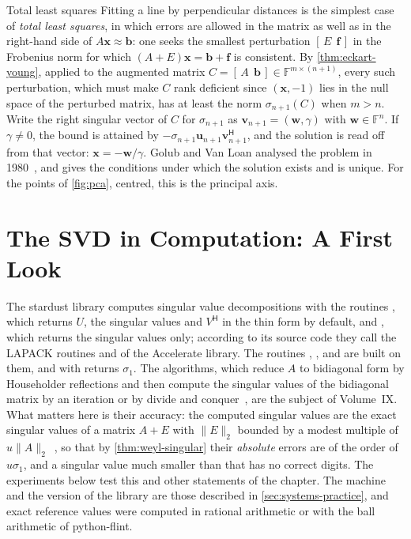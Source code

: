 \begin{note}{Total least squares}
Fitting a line by perpendicular distances is the simplest case of \emph{total least squares}, in which errors are allowed in the matrix as well as in the right-hand side of $A\mathbf x\approx\mathbf b$: one seeks the smallest perturbation $[\,E\ \ \mathbf f\,]$ in the Frobenius norm for which $(A+E)\mathbf x=\mathbf b+\mathbf f$ is consistent. By \cref{thm:eckart-young}, applied to the augmented matrix $C=[\,A\ \ \mathbf b\,]\in\mathbb F^{m\times(n+1)}$, every such perturbation, which must make $C$ rank deficient since $(\mathbf x,-1)$ lies in the null space of the perturbed matrix, has at least the norm $\sigma_{n+1}(C)$ when $m>n$. Write the right singular vector of $C$ for $\sigma_{n+1}$ as $\mathbf v_{n+1}=(\mathbf w,\gamma)$ with $\mathbf w\in\mathbb F^n$. If $\gamma\ne0$, the bound is attained by $-\sigma_{n+1}\mathbf u_{n+1}\mathbf v_{n+1}^{\mathsf H}$, and the solution is read off from that vector: $\mathbf x=-\mathbf w/\gamma$. Golub and Van Loan analysed the problem in 1980~\cite{golubvanloan1980}, and \cite[Sect.~6.3]{golub2013} gives the conditions under which the solution exists and is unique. For the points of \cref{fig:pca}, centred, this is the principal axis.
\end{note}

\section{The SVD in Computation: A First Look}
\label{sec:svd-computation}

The stardust library computes singular value decompositions with the routines , which returns $U$, the singular values and $V^{\mathsf H}$ in the thin form by default, and , which returns the singular values only; according to its source code they call the LAPACK routines  and  of the Accelerate library. The routines , ,  and  are built on them, and  with  returns $\sigma_1$. The algorithms, which reduce $A$ to bidiagonal form by Householder reflections and then compute the singular values of the bidiagonal matrix by an iteration or by divide and conquer~\cite{golubkahan1965,golubreinsch1970}, are the subject of Volume~IX. What matters here is their accuracy: the computed singular values are the exact singular values of a matrix $A+E$ with $\|E\|_2$ bounded by a modest multiple of $u\|A\|_2$~\cite[Sect.~8.6]{golub2013}, so that by \cref{thm:weyl-singular} their \emph{absolute} errors are of the order of $u\sigma_1$, and a singular value much smaller than that has no correct digits. The experiments below test this and other statements of the chapter. The machine and the version of the library are those described in \cref{sec:systems-practice}, and exact reference values were computed in rational arithmetic or with the ball arithmetic of python-flint.

